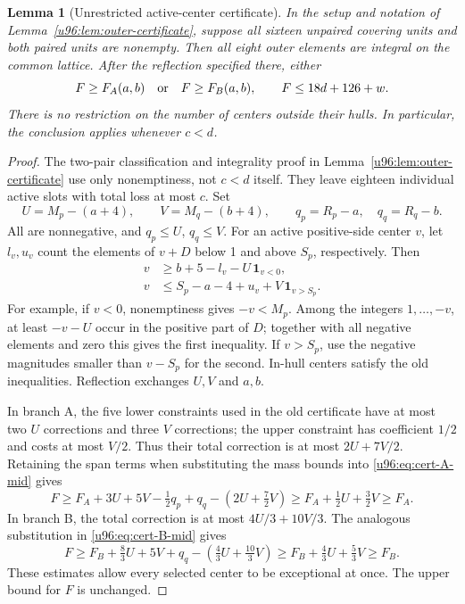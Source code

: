 \documentclass[11pt,a4paper]{article}
\newtheorem{lemma}[theorem]{Lemma}
\theoremstyle{remark}
\begin{document}
\begin{lemma}[Unrestricted active-center certificate]\label{u96:lem:active-sharp}
In the setup and notation of Lemma~\ref{u96:lem:outer-certificate}, suppose all
sixteen unpaired covering units and both paired units are nonempty. Then
all eight outer elements are integral on the common lattice. After the
reflection specified there, either
\[
 F\geq F_A(a,b)\quad\hbox{or}\quad F\geq F_B(a,b),
 \qquad F\leq18d+126+w.
\]
There is no restriction on the number of centers outside their hulls.
In particular, the conclusion applies whenever $c<d$.
\end{lemma}
\begin{proof}
The two-pair classification and integrality proof in
Lemma~\ref{u96:lem:outer-certificate} use only nonemptiness, not $c<d$ itself.
They leave eighteen individual active slots with total loss at most $c$.
Set
\[
 U=M_p-(a+4),\qquad V=M_q-(b+4),\qquad
 q_p=R_p-a,\quad q_q=R_q-b.
\]
All are nonnegative, and $q_p\leq U$, $q_q\leq V$.
For an active positive-side center $v$, let $l_v,u_v$ count the elements
of $v+D$ below 1 and above $S_p$, respectively. Then
\begin{equation}
 \begin{split}
 v&\geq b+5-l_v-U\,\mathbf1_{v<0},\\
 v&\leq S_p-a-4+u_v+V\,\mathbf1_{v>S_p}.
 \end{split}\label{u96:eq:global-quantile}
\end{equation}
For example, if $v<0$, nonemptiness gives $-v<M_p$. Among the integers
$1,\ldots,-v$, at least $-v-U$ occur in the positive part of $D$; together
with all negative elements and zero this gives the first inequality.
If $v>S_p$, use the negative magnitudes smaller than $v-S_p$ for the
second. In-hull centers satisfy the old inequalities. Reflection exchanges
$U,V$ and $a,b$.

In branch A, the five lower constraints used in the old certificate have
at most two $U$ corrections and three $V$ corrections; the upper constraint
has coefficient $1/2$ and costs at most $V/2$. Thus their total correction
is at most $2U+7V/2$. Retaining the span terms when substituting the mass
bounds into \eqref{u96:eq:cert-A-mid} gives
\[
 F\geq F_A+3U+5V-\tfrac12q_p+q_q-(2U+\tfrac72V)
 \geq F_A+\tfrac12U+\tfrac32V\geq F_A.
\]
In branch B, the total correction is at most $4U/3+10V/3$. The analogous
substitution in \eqref{u96:eq:cert-B-mid} gives
\[
 F\geq F_B+\tfrac83U+5V+q_q-(\tfrac43U+\tfrac{10}3V)
 \geq F_B+\tfrac43U+\tfrac53V\geq F_B.
\]
These estimates allow every selected center to be exceptional at once.
The upper bound for $F$ is unchanged.
\end{proof}
\end{document}
